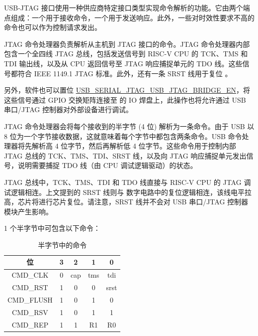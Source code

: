\documentclass[main\_\_CN.tex]{subfiles}
\begin{document}
USB-JTAG 接口使用一种供应商特定接口类型实现命令解析的功能。它由两个端点组成：一个用于接收命令，一个用于发送响应。此外，一些对时效性要求不高的命令也可以作为控制请求发出。

JTAG 命令处理器负责解析从主机到 JTAG 接口的命令。JTAG 命令处理器内部包含一个全四线 JTAG 总线，包括发送信号到 RISC-V CPU 的 TCK、TMS 和 TDI 输出线，以及从 CPU 返回信号至 JTAG 响应捕捉单元的 TDO 线。这些信号都符合 IEEE 1149.1 JTAG 标准。此外，还有一条 SRST 线用于复位 \chipname{}。

另外，软件也可以置位 \hyperref[fielddesc:USBSERIALJTAGUSBJTAGBRIDGEEN]{USB\_SERIAL\_JTAG\_USB\_JTAG\_BRIDGE\_EN}，将这些信号通过 GPIO 交换矩阵连接至 \chipname{} 的 IO 焊盘上，此操作也将允许通过 USB 串口/JTAG 控制器对外部设备进行调试。

JTAG 命令处理器会将每个接收到的半字节 (4 位) 解析为一条命令。由于 USB 以 8 位为一个字节接收数据，这就意味着每个字节中都包含两条命令。USB 命令处理器将先解析高 4 位字节，然后再解析低 4 位字节。这些命令用于控制内部 JTAG 总线的 TCK、TMS、TDI、SRST 线，以及向 JTAG 响应捕捉单元发出信号，说明需要捕捉 TDO 线（由 CPU 调试逻辑驱动）的状态。

JTAG 总线中，TCK、TMS、TDI 和 TDO 线直接与 RISC-V CPU 的 JTAG 调试逻辑相连。上文提到的 SRST 线则与 \chipname{} 数字电路中的复位逻辑相连，该线电平拉高，芯片将进行芯片复位。请注意，SRST 线并不会对 USB 串口/JTAG 控制器模块产生影响。

1 个半字节中可包含以下命令：

\begin{table}[H]
    \centering
    \caption{半字节中的命令}
    \label{tab:usbserialjtag-commands-of-a-nibble}

    \begin{tabular}{|c|c c c c|}
    \hline
        \rowcolor{lightgray}
        \textbf{位} & \textbf{3} & \textbf{2} & \textbf{1} & \textbf{0}
        \\\hline

        CMD\_CLK & 0 &  cap & tms & tdi \\\hline
        CMD\_RST & 1 & 0 & 0 & srst \\\hline
        CMD\_FLUSH & 1 & 0 & 1 & 0 \\\hline
        CMD\_RSV & 1 & 0 & 1 & 1 \\\hline
        CMD\_REP & 1 & 1 & R1 & R0 \\\hline
    \end{tabular}
\end{table}
\end{document}

